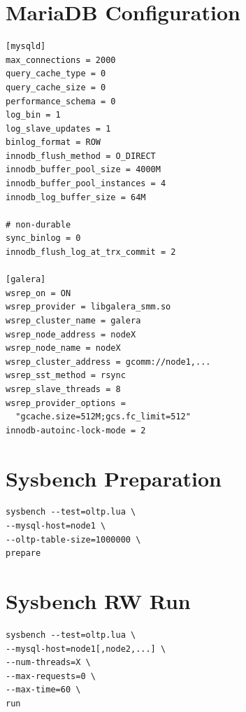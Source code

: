 \documentclass{sig-alternate}
\begin{document}
\sloppy
\printbibliography

\appendix
\section{MariaDB Configuration}
\begin{verbatim}
[mysqld]
max_connections = 2000
query_cache_type = 0
query_cache_size = 0
performance_schema = 0
log_bin = 1
log_slave_updates = 1
binlog_format = ROW
innodb_flush_method = O_DIRECT
innodb_buffer_pool_size = 4000M
innodb_buffer_pool_instances = 4
innodb_log_buffer_size = 64M

# non-durable
sync_binlog = 0
innodb_flush_log_at_trx_commit = 2

[galera]
wsrep_on = ON
wsrep_provider = libgalera_smm.so
wsrep_cluster_name = galera
wsrep_node_address = nodeX
wsrep_node_name = nodeX
wsrep_cluster_address = gcomm://node1,...
wsrep_sst_method = rsync
wsrep_slave_threads = 8
wsrep_provider_options =
  "gcache.size=512M;gcs.fc_limit=512"
innodb-autoinc-lock-mode = 2
\end{verbatim}

\section{Sysbench Preparation}
\begin{verbatim}
sysbench --test=oltp.lua \
--mysql-host=node1 \
--oltp-table-size=1000000 \
prepare
\end{verbatim}

\section{Sysbench RW Run}
\begin{verbatim}
sysbench --test=oltp.lua \
--mysql-host=node1[,node2,...] \
--num-threads=X \
--max-requests=0 \
--max-time=60 \
run
\end{verbatim}
\end{document}
